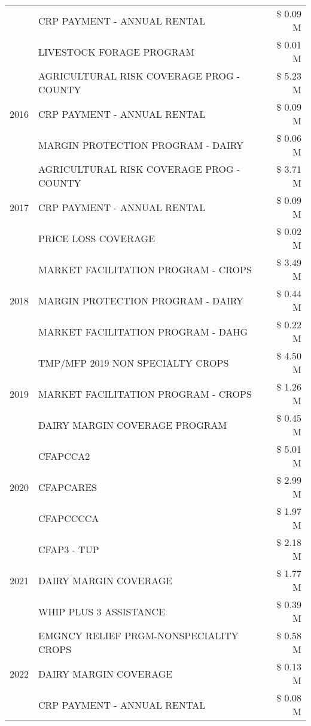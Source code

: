 \begin{tabular}{llr}
 & CRP PAYMENT - ANNUAL RENTAL & \$ 0.09 M \\
 & LIVESTOCK FORAGE PROGRAM & \$ 0.01 M \\
\cline{1-3}
\multirow[t]{3}{*}{2016} & AGRICULTURAL RISK COVERAGE PROG - COUNTY & \$ 5.23 M \\
 & CRP PAYMENT - ANNUAL RENTAL & \$ 0.09 M \\
 & MARGIN PROTECTION PROGRAM - DAIRY & \$ 0.06 M \\
\cline{1-3}
\multirow[t]{3}{*}{2017} & AGRICULTURAL RISK COVERAGE PROG - COUNTY & \$ 3.71 M \\
 & CRP PAYMENT - ANNUAL RENTAL & \$ 0.09 M \\
 & PRICE LOSS COVERAGE & \$ 0.02 M \\
\cline{1-3}
\multirow[t]{3}{*}{2018} & MARKET FACILITATION PROGRAM - CROPS & \$ 3.49 M \\
 & MARGIN PROTECTION PROGRAM - DAIRY & \$ 0.44 M \\
 & MARKET FACILITATION PROGRAM - DAHG & \$ 0.22 M \\
\cline{1-3}
\multirow[t]{3}{*}{2019} & TMP/MFP 2019 NON SPECIALTY CROPS & \$ 4.50 M \\
 & MARKET FACILITATION PROGRAM - CROPS & \$ 1.26 M \\
 & DAIRY MARGIN COVERAGE PROGRAM & \$ 0.45 M \\
\cline{1-3}
\multirow[t]{3}{*}{2020} & CFAPCCA2 & \$ 5.01 M \\
 & CFAPCARES & \$ 2.99 M \\
 & CFAPCCCCA & \$ 1.97 M \\
\cline{1-3}
\multirow[t]{3}{*}{2021} & CFAP3 - TUP & \$ 2.18 M \\
 & DAIRY MARGIN COVERAGE & \$ 1.77 M \\
 & WHIP PLUS 3 ASSISTANCE & \$ 0.39 M \\
\cline{1-3}
\multirow[t]{3}{*}{2022} & EMGNCY RELIEF PRGM-NONSPECIALITY CROPS & \$ 0.58 M \\
 & DAIRY MARGIN COVERAGE & \$ 0.13 M \\
 & CRP PAYMENT - ANNUAL RENTAL & \$ 0.08 M \\
\cline{1-3}
\bottomrule
\end{tabular}
